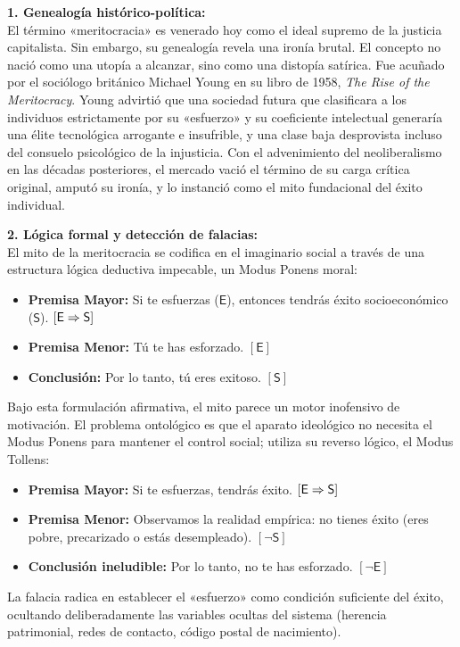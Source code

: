 \begin{argumento}
\textbf{1. Genealogía histórico-política:}\\
El término «meritocracia» es venerado hoy como el ideal supremo de la justicia capitalista. Sin embargo, su genealogía revela una ironía brutal. El concepto no nació como una utopía a alcanzar, sino como una distopía satírica. Fue acuñado por el sociólogo británico Michael Young en su libro de 1958, \textit{The Rise of the Meritocracy}. Young advirtió que una sociedad futura que clasificara a los individuos estrictamente por su «esfuerzo» y su coeficiente intelectual generaría una élite tecnológica arrogante e insufrible, y una clase baja desprovista incluso del consuelo psicológico de la injusticia. Con el advenimiento del neoliberalismo en las décadas posteriores, el mercado vació el término de su carga crítica original, amputó su ironía, y lo instanció como el mito fundacional del éxito individual.

\textbf{2. Lógica formal y detección de falacias:}\\
El mito de la meritocracia se codifica en el imaginario social a través de una estructura lógica deductiva impecable, un Modus Ponens moral:
\begin{itemize}
    \item \textbf{Premisa Mayor:} Si te esfuerzas ($\mathsf{E}$), entonces tendrás éxito socioeconómico ($\mathsf{S}$). $[\mathsf{E} \Rightarrow \mathsf{S}]$
    \item \textbf{Premisa Menor:} Tú te has esforzado. $[\mathsf{E}]$
    \item \textbf{Conclusión:} Por lo tanto, tú eres exitoso. $[\mathsf{S}]$
\end{itemize}
Bajo esta formulación afirmativa, el mito parece un motor inofensivo de motivación. El problema ontológico es que el aparato ideológico no necesita el Modus Ponens para mantener el control social; utiliza su reverso lógico, el Modus Tollens:
\begin{itemize}
    \item \textbf{Premisa Mayor:} Si te esfuerzas, tendrás éxito. $[\mathsf{E} \Rightarrow \mathsf{S}]$
    \item \textbf{Premisa Menor:} Observamos la realidad empírica: no tienes éxito (eres pobre, precarizado o estás desempleado). $[\neg\mathsf{S}]$
    \item \textbf{Conclusión ineludible:} Por lo tanto, no te has esforzado. $[\neg\mathsf{E}]$
\end{itemize}
La falacia radica en establecer el «esfuerzo» como condición suficiente del éxito, ocultando deliberadamente las variables ocultas del sistema (herencia patrimonial, redes de contacto, código postal de nacimiento). 


\end{argumento}
